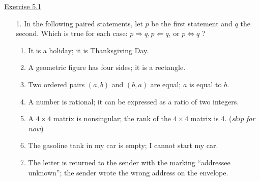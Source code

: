 \documentclass{./../../Latex/handout}
\begin{document}
\underline{Exercise 5.1}
\begin{enumerate}
\item[1.] In the following paired statements, let $p$ be the first statement and $q$ the second. Which is true for each case: $p \Rightarrow q, p \Leftarrow q$, or $p \Leftrightarrow q$ ?
\begin{enumerate}
\item It is a holiday; it is Thanksgiving Day.
\item A geometric figure has four sides; it is a rectangle.
\item Two ordered pairs $(a, b)$ and $(b, a)$ are equal; $a$ is equal to $b$.
\item A number is rational; it can be expressed as a ratio of two integers.
\item A $4 \times 4$ matrix is nonsingular; the rank of the $4 \times 4$ matrix is 4. (\textit{skip for now})
\item The gasoline tank in my car is empty; I cannot start my car.
\item The letter is returned to the sender with the marking ``addressee unknown''; the sender wrote the wrong address on the envelope.\end{enumerate}
\end{enumerate}
\end{document}

